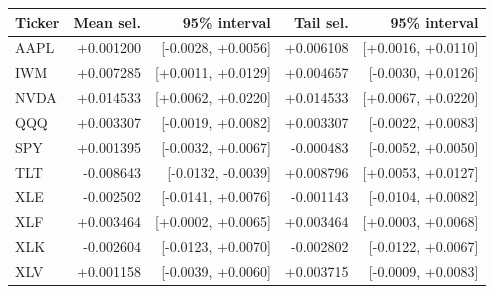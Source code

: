 \begin{tabular}{lrrrr}
\toprule
Ticker & Mean sel. & 95\% interval & Tail sel. & 95\% interval \\
\midrule
AAPL & +0.001200 & [-0.0028, +0.0056] & +0.006108 & [+0.0016, +0.0110] \\
IWM & +0.007285 & [+0.0011, +0.0129] & +0.004657 & [-0.0030, +0.0126] \\
NVDA & +0.014533 & [+0.0062, +0.0220] & +0.014533 & [+0.0067, +0.0220] \\
QQQ & +0.003307 & [-0.0019, +0.0082] & +0.003307 & [-0.0022, +0.0083] \\
SPY & +0.001395 & [-0.0032, +0.0067] & -0.000483 & [-0.0052, +0.0050] \\
TLT & -0.008643 & [-0.0132, -0.0039] & +0.008796 & [+0.0053, +0.0127] \\
XLE & -0.002502 & [-0.0141, +0.0076] & -0.001143 & [-0.0104, +0.0082] \\
XLF & +0.003464 & [+0.0002, +0.0065] & +0.003464 & [+0.0003, +0.0068] \\
XLK & -0.002604 & [-0.0123, +0.0070] & -0.002802 & [-0.0122, +0.0067] \\
XLV & +0.001158 & [-0.0039, +0.0060] & +0.003715 & [-0.0009, +0.0083] \\
\bottomrule
\end{tabular}
